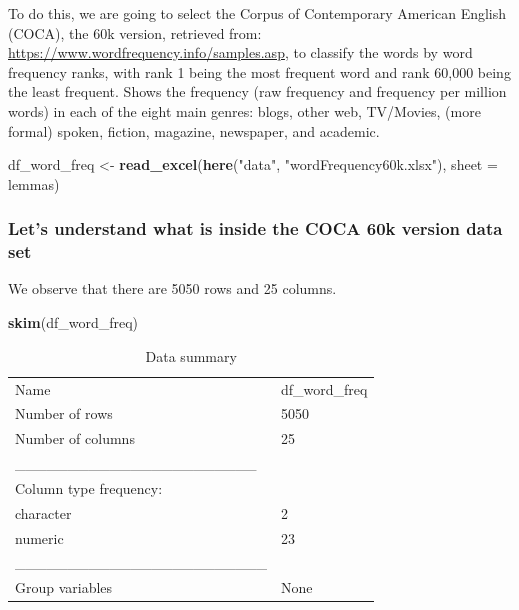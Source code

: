 \documentclass[
]{article}
\newenvironment{Shaded}{\begin{snugshade}}{\end{snugshade}}
\newcommand{\AttributeTok}[1]{\textcolor[rgb]{0.13,0.29,0.53}{#1}}
\newcommand{\FunctionTok}[1]{\textcolor[rgb]{0.13,0.29,0.53}{\textbf{#1}}}
\newcommand{\NormalTok}[1]{#1}
\newcommand{\OtherTok}[1]{\textcolor[rgb]{0.56,0.35,0.01}{#1}}
\newcommand{\StringTok}[1]{\textcolor[rgb]{0.31,0.60,0.02}{#1}}
\begin{document}
To do this, we are going to select the Corpus of Contemporary American
English (COCA), the 60k version, retrieved from:
\url{https://www.wordfrequency.info/samples.asp}, to classify the words
by word frequency ranks, with rank 1 being the most frequent word and
rank 60,000 being the least frequent. Shows the frequency (raw frequency
and frequency per million words) in each of the eight main genres:
blogs, other web, TV/Movies, (more formal) spoken, fiction, magazine,
newspaper, and academic.

\begin{Shaded}
\begin{Highlighting}[]
\NormalTok{df\_word\_freq }\OtherTok{\textless{}{-}} \FunctionTok{read\_excel}\NormalTok{(}\FunctionTok{here}\NormalTok{(}\StringTok{"data"}\NormalTok{, }\StringTok{"wordFrequency60k.xlsx"}\NormalTok{), }
                           \AttributeTok{sheet =} \StringTok{\textquotesingle{}lemmas\textquotesingle{}}\NormalTok{) }
\end{Highlighting}
\end{Shaded}

\hypertarget{lets-understand-what-is-inside-the-coca-60k-version-data-set}{%
\subsubsection{Let's understand what is inside the COCA 60k version data
set}\label{lets-understand-what-is-inside-the-coca-60k-version-data-set}}

We observe that there are 5050 rows and 25 columns.

\begin{Shaded}
\begin{Highlighting}[]
\FunctionTok{skim}\NormalTok{(df\_word\_freq)}
\end{Highlighting}
\end{Shaded}

\begin{longtable}[]{@{}ll@{}}
\caption{Data summary}\tabularnewline
\toprule\noalign{}
\endfirsthead
\endhead
\bottomrule\noalign{}
\endlastfoot
Name & df\_word\_freq \\
Number of rows & 5050 \\
Number of columns & 25 \\
\_\_\_\_\_\_\_\_\_\_\_\_\_\_\_\_\_\_\_\_\_\_\_ & \\
Column type frequency: & \\
character & 2 \\
numeric & 23 \\
\_\_\_\_\_\_\_\_\_\_\_\_\_\_\_\_\_\_\_\_\_\_\_\_ & \\
Group variables & None \\
\end{longtable}
\end{document}
